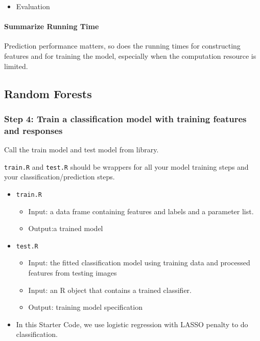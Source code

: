 \documentclass[
]{article}
\providecommand{\tightlist}{%
  \setlength{\itemsep}{0pt}\setlength{\parskip}{0pt}}
\begin{document}
\begin{itemize}
\tightlist
\item
  Evaluation
\end{itemize}

\hypertarget{summarize-running-time-2}{%
\paragraph{Summarize Running Time}\label{summarize-running-time-2}}

Prediction performance matters, so does the running times for
constructing features and for training the model, especially when the
computation resource is limited.

\newpage

\hypertarget{random-forests}{%
\subsection{Random Forests}\label{random-forests}}

\hypertarget{step-4-train-a-classification-model-with-training-features-and-responses-3}{%
\subsubsection{Step 4: Train a classification model with training
features and
responses}\label{step-4-train-a-classification-model-with-training-features-and-responses-3}}

Call the train model and test model from library.

\texttt{train.R} and \texttt{test.R} should be wrappers for all your
model training steps and your classification/prediction steps.

\begin{itemize}
\tightlist
\item
  \texttt{train.R}

  \begin{itemize}
  \tightlist
  \item
    Input: a data frame containing features and labels and a parameter
    list.
  \item
    Output:a trained model
  \end{itemize}
\item
  \texttt{test.R}

  \begin{itemize}
  \tightlist
  \item
    Input: the fitted classification model using training data and
    processed features from testing images
  \item
    Input: an R object that contains a trained classifier.
  \item
    Output: training model specification
  \end{itemize}
\item
  In this Starter Code, we use logistic regression with LASSO penalty to
  do classification.
\end{itemize}
\end{document}
